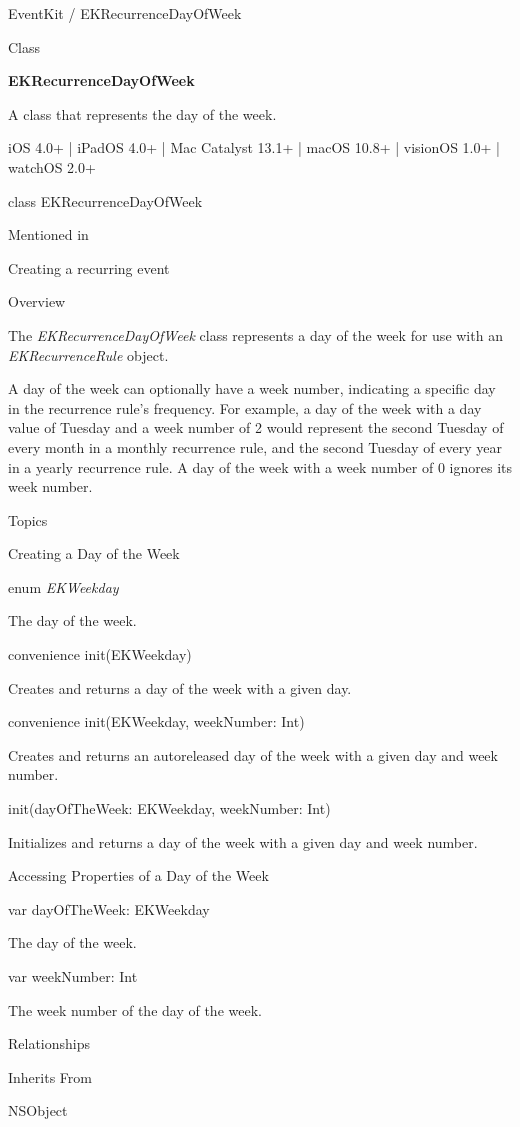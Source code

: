 \documentclass{article}
\title{}
\author{}
\date{}
\begin{document}
EventKit / EKRecurrenceDayOfWeek

Class

\textbf{EKRecurrenceDayOfWeek}

A class that represents the day of the week.

iOS 4.0+ | iPadOS 4.0+ | Mac Catalyst 13.1+ | macOS 10.8+ | visionOS 1.0+ | watchOS 2.0+

class EKRecurrenceDayOfWeek

Mentioned in

Creating a recurring event

Overview

The \textit{EKRecurrenceDayOfWeek} class represents a day of the week for use with an \textit{EKRecurrenceRule} object.

A day of the week can optionally have a week number, indicating a specific day in the recurrence rule's frequency. For example, a day of the week with a day value of Tuesday and a week number of 2 would represent the second Tuesday of every month in a monthly recurrence rule, and the second Tuesday of every year in a yearly recurrence rule. A day of the week with a week number of 0 ignores its week number.

Topics

Creating a Day of the Week

enum \textit{EKWeekday}

The day of the week.

convenience init(EKWeekday)

Creates and returns a day of the week with a given day.

convenience init(EKWeekday, weekNumber: Int)

Creates and returns an autoreleased day of the week with a given day and week number.

init(dayOfTheWeek: EKWeekday, weekNumber: Int)

Initializes and returns a day of the week with a given day and week number.

Accessing Properties of a Day of the Week

var dayOfTheWeek: EKWeekday

The day of the week.

var weekNumber: Int

The week number of the day of the week.

Relationships

Inherits From

NSObject
\end{document}
